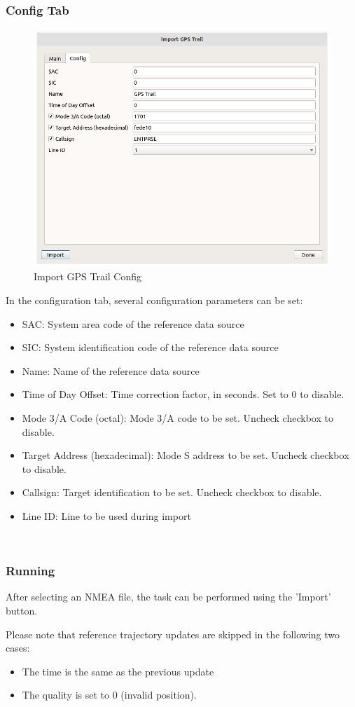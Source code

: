 \subsubsection{Config Tab}

\begin{figure}[H]
    \includegraphics[width=16cm]{figures/gps_import_config.png}
  \caption{Import GPS Trail Config}
\end{figure}

In the configuration tab, several configuration parameters can be set:

\begin{itemize}
\item SAC: System area code of the reference data source
\item SIC: System identification code of the reference data source
\item Name: Name of the reference data source
\item Time of Day Offset: Time correction factor, in seconds. Set to 0 to disable.
\item Mode 3/A Code (octal): Mode 3/A code to be set. Uncheck checkbox to disable.
\item Target Address (hexadecimal): Mode S address to be set. Uncheck checkbox to disable.
\item Callsign: Target identification to be set. Uncheck checkbox to disable.
\item Line ID: Line to be used during import
\end{itemize}
\ \\

\subsubsection{Running}

After selecting an NMEA file, the task can be performed using the 'Import' button.

Please note that reference trajectory updates are skipped in the following two cases:
\begin{itemize}
\item The time is the same as the previous update
\item The quality is set to 0 (invalid position).
\end{itemize}
